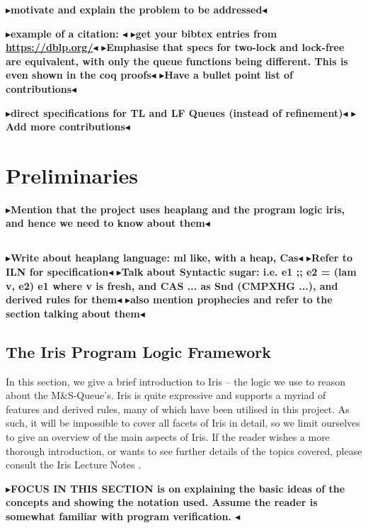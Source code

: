 \documentclass[a4paper, 10pt]{report}
\theoremstyle{definition}
\newcommand{\msq}{M\&S-Queue\xspace}
\newcommand{\todo}[1]{{\color[rgb]{.5,0,0}\textbf{$\blacktriangleright$#1$\blacktriangleleft$}}}
\begin{document}
\todo{motivate and explain the problem to be addressed}

\todo{example of a citation: \cite{DBLP:conf/podc/MichaelS96}}
\todo{get your bibtex entries from \url{https://dblp.org/}}
\todo{Emphasise that specs for two-lock and lock-free are equivalent, with only the queue functions being different. This is even shown in the coq proofs}
\todo{Have a bullet point list of contributions}


\todo{direct specifications for TL and LF Queues (instead of refinement)}
\todo{Add more contributions}




\chapter{Preliminaries}
\label{ch:preliminaries}

\todo{Mention that the project uses heaplang and the program logic iris, and hence we need to know about them}


\section{\heaplang}
\label{Pre:section:heaplang}

\todo{Write about heaplang language: ml like, with a heap, Cas}
\todo{Refer to ILN for specification}
\todo{Talk about Syntactic sugar: i.e. e1 ;; e2 = (lam v, e2) e1 where v is fresh, and CAS ... as Snd (CMPXHG ...), and derived rules for them}
\todo{also mention prophecies and refer to the section talking about them}


\section{The Iris Program Logic Framework}
\label{Pre:section:iris}
In this section, we give a brief introduction to Iris -- the logic we use to reason about the \msq's. Iris is quite expressive and supports a myriad of features and derived rules, many of which have been utilised in this project. As such, it will be impossible to cover all facets of Iris in detail, so we limit ourselves to give an overview of the main aspects of Iris. If the reader wishes a more thorough introduction, or wants to see further details of the topics covered, please consult the Iris Lecture Notes \cite{gentleiris}.

\todo{FOCUS IN THIS SECTION is on explaining the basic ideas of the concepts and showing the notation used. Assume the reader is somewhat familiar with program verification. }
\end{document}

